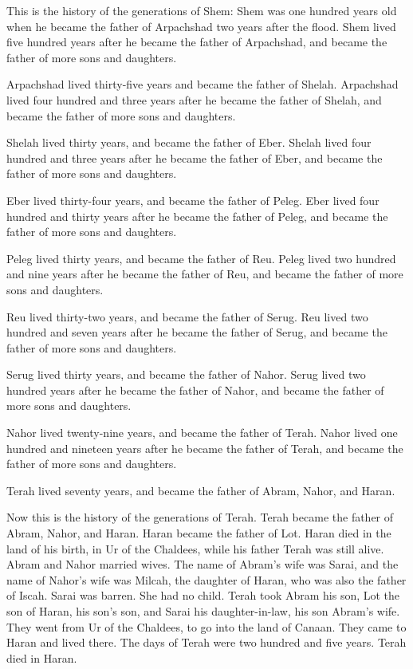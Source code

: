  This is the history of the generations of Shem: Shem was
one hundred years old when he became the father of Arpachshad two years
after the flood.  Shem lived five hundred years after he
became the father of Arpachshad, and became the father of more sons and
daughters.

 Arpachshad lived thirty-five years and became the father
of Shelah.  Arpachshad lived four hundred and three years
after he became the father of Shelah, and became the father of more sons
and daughters.

 Shelah lived thirty years, and became the father of
Eber.  Shelah lived four hundred and three years after he
became the father of Eber, and became the father of more sons and
daughters.

 Eber lived thirty-four years, and became the father of
Peleg.  Eber lived four hundred and thirty years after he
became the father of Peleg, and became the father of more sons and
daughters.

 Peleg lived thirty years, and became the father of Reu.
 Peleg lived two hundred and nine years after he became
the father of Reu, and became the father of more sons and daughters.

 Reu lived thirty-two years, and became the father of
Serug.  Reu lived two hundred and seven years after he
became the father of Serug, and became the father of more sons and
daughters.

 Serug lived thirty years, and became the father of
Nahor.  Serug lived two hundred years after he became the
father of Nahor, and became the father of more sons and daughters.

 Nahor lived twenty-nine years, and became the father of
Terah.  Nahor lived one hundred and nineteen years after
he became the father of Terah, and became the father of more sons and
daughters.

 Terah lived seventy years, and became the father of
Abram, Nahor, and Haran.

 Now this is the history of the generations of Terah.
Terah became the father of Abram, Nahor, and Haran. Haran became the
father of Lot.  Haran died in the land of his birth, in
Ur of the Chaldees, while his father Terah was still alive.
 Abram and Nahor married wives. The name of Abram's wife
was Sarai, and the name of Nahor's wife was Milcah, the daughter of
Haran, who was also the father of Iscah.  Sarai was
barren. She had no child.  Terah took Abram his son, Lot
the son of Haran, his son's son, and Sarai his daughter-in-law, his son
Abram's wife. They went from Ur of the Chaldees, to go into the land of
Canaan. They came to Haran and lived there.  The days of
Terah were two hundred and five years. Terah died in Haran.

